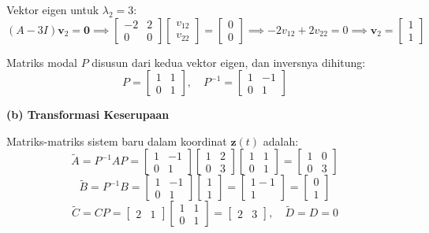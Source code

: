 \documentclass[11pt,a4paper]{article}
\begin{document}
Vektor eigen untuk $\lambda_2 = 3$:
$$(A - 3I)\mathbf{v}_2 = \mathbf{0} \implies \begin{bmatrix} -2 & 2 \\ 0 & 0 \end{bmatrix} \begin{bmatrix} v_{12} \\ v_{22} \end{bmatrix} = \begin{bmatrix} 0 \\ 0 \end{bmatrix} \implies -2v_{12} + 2v_{22} = 0 \implies \mathbf{v}_2 = \begin{bmatrix} 1 \\ 1 \end{bmatrix}$$

Matriks modal $P$ disusun dari kedua vektor eigen, dan inversnya dihitung:
$$P = \begin{bmatrix} 1 & 1 \\ 0 & 1 \end{bmatrix}, \quad P^{-1} = \begin{bmatrix} 1 & -1 \\ 0 & 1 \end{bmatrix}$$

\textbf{(b) Transformasi Keserupaan}

Matriks-matriks sistem baru dalam koordinat $\mathbf{z}(t)$ adalah:
$$\tilde{A} = P^{-1} A P = \begin{bmatrix} 1 & -1 \\ 0 & 1 \end{bmatrix} \begin{bmatrix} 1 & 2 \\ 0 & 3 \end{bmatrix} \begin{bmatrix} 1 & 1 \\ 0 & 1 \end{bmatrix} = \begin{bmatrix} 1 & 0 \\ 0 & 3 \end{bmatrix}$$
$$\tilde{B} = P^{-1} B = \begin{bmatrix} 1 & -1 \\ 0 & 1 \end{bmatrix} \begin{bmatrix} 1 \\ 1 \end{bmatrix} = \begin{bmatrix} 1 - 1 \\ 1 \end{bmatrix} = \begin{bmatrix} 0 \\ 1 \end{bmatrix}$$
$$\tilde{C} = C P = \begin{bmatrix} 2 & 1 \end{bmatrix} \begin{bmatrix} 1 & 1 \\ 0 & 1 \end{bmatrix} = \begin{bmatrix} 2 & 3 \end{bmatrix}, \quad \tilde{D} = D = 0$$
\end{document}
